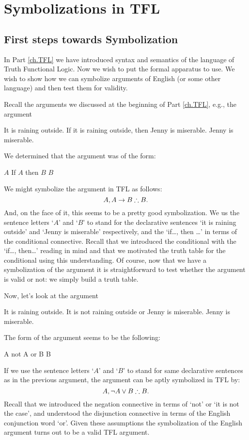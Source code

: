 \part{Symbolizations in TFL}
\label{ch.TFLsymb}
\chapter{First steps towards Symbolization}
In Part \ref{ch.TFL} we have introduced syntax and semantics of the language of Truth Functional Logic. Now we wish to put the formal apparatus to use. We wish to show how we can symbolize arguments of English (or some other language) and then test them for validity.

Recall the arguments we discussed at the beginning of Part \ref{ch.TFL}, e.g., the argument
\begin{earg}
		\prem It is raining outside.
		\prem If it is raining outside, then Jenny is miserable.
		\conc Jenny is miserable.
	\end{earg}

We determined that the argument was of the form:
\begin{earg}
\prem	$A$
\prem	If $A$ then $B$
\conc $B$
\end{earg}

 We might symbolize the argument in TFL as follows:
 $$A,A\eif B\therefore B.$$
And, on the face of it, this seems to be a pretty good symbolization.  We us the sentence letters `$A$' and `$B$' to stand for the declarative sentences `it is raining outside' and `Jenny is miserable' respectively, and the `if\ldots, then \ldots' in terms of the conditional connective. Recall that we introduced the conditional with the `if\ldots, then\ldots' reading in mind and that we motivated the truth table for the conditional using this understanding. Of course, now that we have a symbolization of the argument it is straightforward to test whether the argument is valid or not: we simply build a truth table.

Now, let's look at the argument
\begin{earg}
		\prem It is raining outside.
		\prem  It is not raining outside or Jenny is miserable.
		\conc Jenny is miserable.
	\end{earg}
The form of the argument seems to be the following:
\begin{earg}
		\prem A
		\prem  not A or B
		\conc B
	\end{earg}
If we use the sentence letters `$A$' and `$B$' to stand for same declarative sentences as in the previous argument, the argument can be aptly symbolized in TFL by:
$$A,\enot A\eor B\therefore B.$$
Recall that we introduced the negation connective in terms of `not' or `it is not the case', and understood the disjunction connective in terms of the English conjunction word `or'. Given these assumptions the symbolization of the English argument turns out to be a valid TFL argument.

